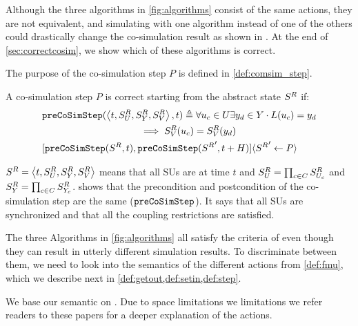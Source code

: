 Although the three algorithms in \cref{fig:algorithms} consist of the same actions, they are not equivalent, and simulating with one algorithm instead of one of the others could drastically change the co-simulation result as shown in \cite{Gomes2019c,hansen_verification_2021}. 
At the end of \cref{sec:correctcosim}, we show which of these algorithms is correct.

The purpose of the co-simulation step $P$ is defined in \cref{def:comsim_step}.

\begin{definition}\label{def:comsim_step}
  A co-simulation step $P$ is correct starting from the abstract state $S^{R}_{}$ if:
  \begin{align}
    &\mathtt{preCoSimStep}( \left\langle t,S^{R}_{U}, S^{R}_{Y},S^{R}_{V} \right\rangle , t) \triangleq 
    \forall u_{c} \in U
    \exists y_{d} \in Y
    \cdot L(u_{c}) = y_{d}  \nonumber \\
    &\qquad \qquad \qquad \qquad \qquad \implies
    S^{R}_{V}(u_{c}) = S^{R}_{V}(y_{d}) \nonumber \\
    &[\mathtt{preCoSimStep}(S^{R}_{}, t), 
    \mathtt{preCoSimStep}({S^{R}_{}}', t+H)] 
    \langle {S^{R}_{}}' \gets P\rangle
  \end{align}
\end{definition}

$S^{R}_{} =  \left\langle t, S^{R}_{U}, S^{R}_{Y}, S^{R}_{V} \right\rangle $ means that all SUs are at time $t$ and $S^{R}_{U} = \prod_{c \in C}S^{R}_{U_{c}}$ and $S^{R}_{Y} = \prod_{c \in C}S^{R}_{Y_{c}}$.
 shows that the precondition and postcondition of the co-simulation step are the same ($\mathtt{preCoSimStep}$).
It says that all SUs are synchronized and that all the coupling restrictions are satisfied.

The three Algorithms in \cref{fig:algorithms} all satisfy the criteria of \label{eq:co_sim_step} even though they can result in utterly different simulation results.
To discriminate between them, we need to look into the semantics of the different actions from \cref{def:fmu}, which we describe next in \cref{def:getout,def:setin,def:step}.

We base our semantic on \cite{Gomes2019a,hansen_verification_2021}.
Due to space limitations we limitations we refer readers to these papers for a deeper explanation of the actions.

